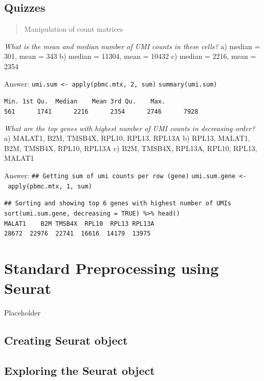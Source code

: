 \documentclass[
]{book}
\begin{document}
\hypertarget{quizzes}{%
\section{Quizzes}\label{quizzes}}

\begin{quote}
Manipulation of count matrices
\end{quote}

\emph{What is the mean and median number of UMI counts in these cells?}
a) median = 301, mean = 343
b) median = 11304, mean = 10432
c) median = 2216, mean = 2354

Answer:
\texttt{umi.sum\ \textless{}-\ apply(pbmc.mtx,\ 2,\ sum)}
\texttt{summary(umi.sum)}

\texttt{Min.\ 1st\ Qu.\ \ Median\ \ \ \ Mean\ 3rd\ Qu.\ \ \ \ Max.}
\texttt{561\ \ \ \ \ \ 1741\ \ \ \ \ \ 2216\ \ \ \ \ \ 2354\ \ \ \ \ \ 2746\ \ \ \ \ \ 7928}

\emph{What are the top genes with highest number of UMI counts in decreasing order?}
a) MALAT1, B2M, TMSB4X, RPL10, RPL13, RPL13A
b) RPL13, MALAT1, B2M, TMSB4X, RPL10, RPL13A
c) B2M, TMSB4X, RPL13A, RPL10, RPL13, MALAT1

Answer:
\texttt{\#\#\ Getting\ sum\ of\ umi\ counts\ per\ row\ (gene)}
\texttt{umi.sum.gene\ \textless{}-\ apply(pbmc.mtx,\ 1,\ sum)}

\texttt{\#\#\ Sorting\ and\ showing\ top\ 6\ genes\ with\ highest\ number\ of\ UMIs}
\texttt{sort(umi.sum.gene,\ decreasing\ =\ TRUE)\ \%\textgreater{}\%\ head()}
\texttt{MALAT1\ \ \ \ B2M\ TMSB4X\ \ RPL10\ \ RPL13\ RPL13A}
\texttt{28672\ \ 22976\ \ 22741\ \ 16616\ \ 14179\ \ 13975}

\hypertarget{standard-preprocessing-using-seurat}{%
\chapter{Standard Preprocessing using Seurat}\label{standard-preprocessing-using-seurat}}

Placeholder

\hypertarget{creating-seurat-object}{%
\section{Creating Seurat object}\label{creating-seurat-object}}

\hypertarget{exploring-the-seurat-object}{%
\section{Exploring the Seurat object}\label{exploring-the-seurat-object}}
\end{document}
